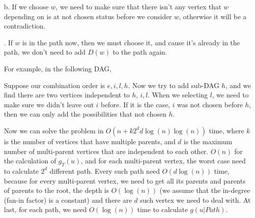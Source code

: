 \documentclass[11pt]{article}
\begin{document}
	\qquad b. If we choose $w$, we need to make sure that there isn't any vertex that $w$ depending on is at not chosen status before we consider $w$, otherwise it will be a contradiction.
	
	. If $w$ is in the path now, then we must choose it, and cause it's already in the path, we don't need to add $D(w)$ to the path again.
	
	\bigskip
	For example, in the following DAG,
	
	
	Suppose our combination order is $e, i, l, h$. Now we try to add sub-DAG $h$, and we find there are two vertices independent to $h$, $i,l$. When we selecting $l$, we need to make sure we didn't leave out $i$ before. If it is the case, $i$ was not chosen before $h$, then we can only add the possibilities that not chosen $h$.
	
	
	\bigskip
	
	Now we can solve the problem in $O(n + k2^dd\log(n)\log(n))$ time, where $k$ is the number of vertices that have multiple parents, and $d$ is the maximum number of multi-parent vertices that are independent to each other. $O(n)$ for the calculation of $g_T(u)$, and for each multi-parent vertex, the worst case need to calculate $2^d$ different path. Every such path need $O(d\log(n))$ time, because for every multi-parent vertex, we need to get all its parents and parents of parents to the root, the depth is $O(\log(n))$ (we assume that the in-degree (fan-in factor) is a constant) and there are $d$ such vertex we need to deal with. At last, for each path, we need $O(\log(n))$ time to calculate $g(u|Path)$.
	
\end{document}
